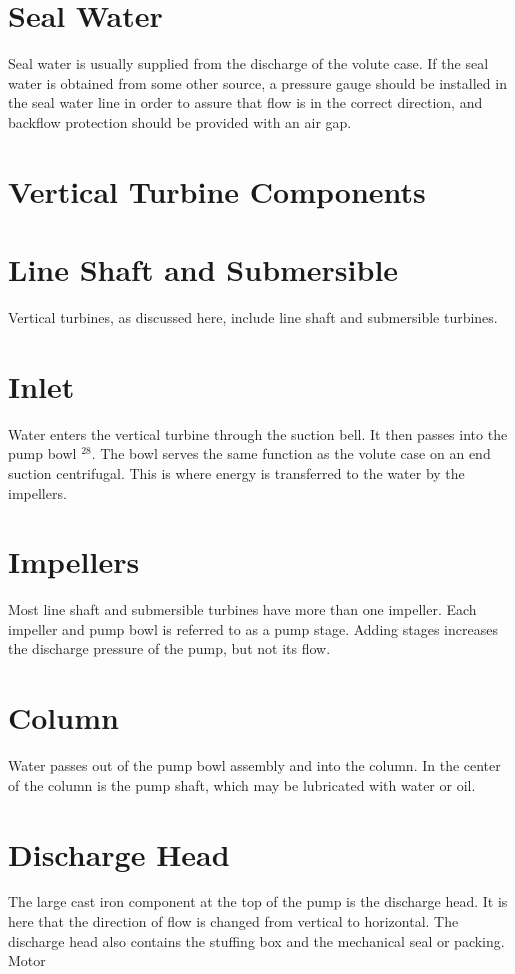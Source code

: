 \documentclass[10pt]{article}
\begin{document}
\section{Seal Water}
Seal water is usually supplied from the discharge of the volute case. If the seal water is obtained from some other source, a pressure gauge should be installed in the seal water line in order to assure that flow is in the correct direction, and backflow protection should be provided with an air gap.

\section{Vertical Turbine Components}
\section{Line Shaft and Submersible}
Vertical turbines, as discussed here, include line shaft and submersible turbines.

\section{Inlet}
Water enters the vertical turbine through the suction bell. It then passes into the pump bowl ${ }^{28}$. The bowl serves the same function as the volute case on an end suction centrifugal. This is where energy is transferred to the water by the impellers.

\section{Impellers}
Most line shaft and submersible turbines have more than one impeller. Each impeller and pump bowl is referred to as a pump stage. Adding stages increases the discharge pressure of the pump, but not its flow.

\section{Column}
Water passes out of the pump bowl assembly and into the column. In the center of the column is the pump shaft, which may be lubricated with water or oil.

\section{Discharge Head}
The large cast iron component at the top of the pump is the discharge head. It is here that the direction of flow is changed from vertical to horizontal. The discharge head also contains the stuffing box and the mechanical seal or packing. Motor
\end{document}
